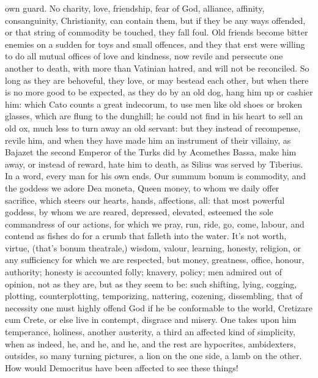 {own guard. No charity, love, friendship, fear of God, alliance,
affinity, consanguinity, Christianity, can contain them, but if they be
any ways offended, or that string of commodity be touched, they fall
foul. Old friends become bitter enemies on a sudden for toys and small
offences, and they that erst were willing to do all mutual offices of
love and kindness, now revile and persecute one another to death, with
more than Vatinian hatred, and will not be reconciled. So long as they
are behoveful, they love, or may bestead each other, but when there is
no more good to be expected, as they do by an old dog, hang him up or
cashier him: which  Cato counts a great indecorum, to use men like
old shoes or broken glasses, which are flung to the dunghill; he could
not find in his heart to sell an old ox, much less to turn away an old
servant: but they instead of recompense, revile him, and when they have
made him an instrument of their villainy, as Bajazet the second
Emperor of the Turks did by Acomethes Bassa, make him away, or instead
of reward, hate him to death, as Silius was served by Tiberius. In
a word, every man for his own ends. Our summum bonum is commodity, and
the goddess we adore Dea moneta, Queen money, to whom we daily offer
sacrifice, which steers our hearts, hands, affections, all: that
most powerful goddess, by whom we are reared, depressed, elevated,
esteemed the sole commandress of our actions, for which we pray,
run, ride, go, come, labour, and contend as fishes do for a crumb that
falleth into the water. It's not worth, virtue, (that's bonum
theatrale,) wisdom, valour, learning, honesty, religion, or any
sufficiency for which we are respected, but money, greatness,
office, honour, authority; honesty is accounted folly; knavery, policy;
men admired out of opinion, not as they are, but as they seem to
be: such shifting, lying, cogging, plotting, counterplotting,
temporizing, nattering, cozening, dissembling, that of necessity
one must highly offend God if he be conformable to the world, Cretizare
cum Crete, or else live in contempt, disgrace and misery. One takes
upon him temperance, holiness, another austerity, a third an affected
kind of simplicity, when as indeed, he, and he, and he, and the rest
are hypocrites, ambidexters, outsides, so many turning pictures, a
lion on the one side, a lamb on the other. How would Democritus
have been affected to see these things!

}
